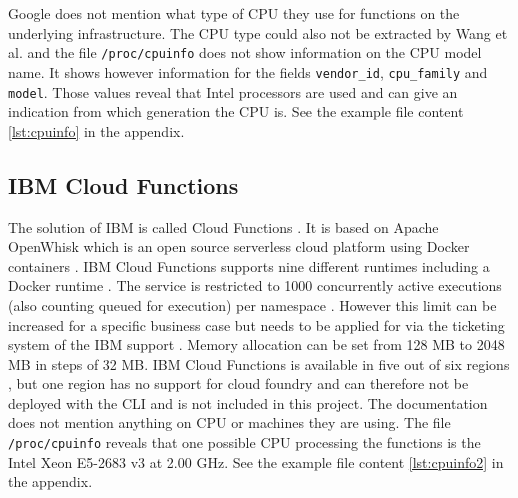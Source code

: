 \begin{table}[htp]
\centering
\caption[Google Cloud Functions - Possible memory allocation and corresponding CPU frequency]{Google Cloud Functions - Possible memory allocation and corresponding CPU frequency\\Source: Google Cloud documentation \cite{GoogleFunctionsPricing}}
\label{table:google_functions_cpu_ram}
\end{table}

Google does not mention what type of CPU they use for functions on the underlying infrastructure. The CPU type could also not be extracted by Wang et al. \cite{216063} and the file \texttt{/proc/cpuinfo} does not show information on the CPU model name. It shows however information for the fields \texttt{vendor\_id}, \texttt{cpu\_family} and \texttt{model}. Those values reveal that Intel processors are used and can give an indication from which generation the CPU is. See the example file content \ref{lst:cpuinfo} in the appendix. 

\subsection{IBM Cloud Functions}

The solution of \gls{IBM} is called Cloud Functions \cite{IBMFunctions}. It is based on Apache OpenWhisk which is an open source serverless cloud platform using Docker containers \cite{OpenWhisk}. \gls{IBM} Cloud Functions supports nine different runtimes including a Docker runtime \cite{IBMRuntimes}. The service is restricted to 1000 concurrently active executions (also counting queued for execution) per namespace \cite{IBMLimits}. However this limit can be increased for a specific business case but needs to be applied for via the ticketing system of the \gls{IBM} support \cite{IBMLimits}. Memory allocation can be set from 128 \gls{MB} to 2048 \gls{MB} in steps of 32 \gls{MB}. \gls{IBM} Cloud Functions is available in five out of six regions \cite{IBMLocations}, but one region has no support for cloud foundry \cite{IBMCloudFoundry} and can therefore not be deployed with the \gls{CLI} and is not included in this project. The documentation does not mention anything on \gls{CPU} or machines they are using. The file \texttt{/proc/cpuinfo} reveals that one possible \gls{CPU} processing the functions is the Intel Xeon E5-2683 v3 at 2.00 \gls{GHz}. See the example file content \ref{lst:cpuinfo2} in the appendix.

